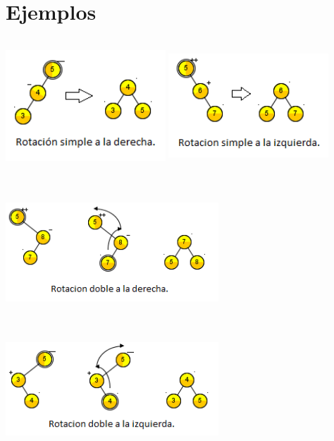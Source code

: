\documentclass[12pt,letterpaper]{article}
\begin{document}
\section{Ejemplos}
\vskip 1.3cm
\begin{multicols}{2}
\begin{flushleft}
\includegraphics[width=6cm,height=5cm]{rotacionsimplederecha} 
\vskip 3.6cm
\includegraphics[width=6cm,height=5cm]{rotacionsimpleizquierda} 
\end{flushleft}

\begin{flushright}
\includegraphics[width=8cm,height=5cm]{rotaciondoblederecha} 
\vskip 3.6cm
\includegraphics[width=8cm,height=5cm]{rotaciondobleizquierda} 
\end{flushright}

\end{multicols}
\newpage
\end{document}
